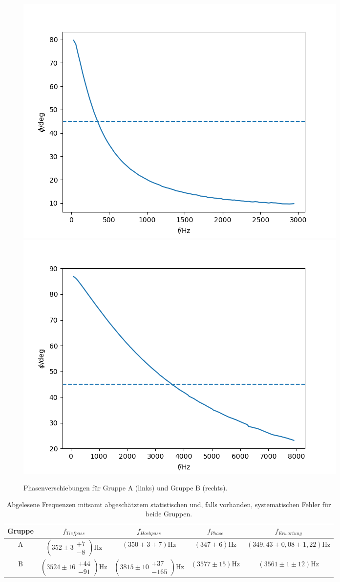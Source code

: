 \documentclass[12pt,a4paper]{article}
\begin{document}
\begin{figure}
\centering
\includegraphics[scale=0.5]{Bilder/PhaseHochTief_A.png}
\includegraphics[scale=0.5]{Bilder/PhaseHochTief_B.png}
\caption{Phasenverschiebungen für Gruppe A (links) und Gruppe B (rechts).}
\label{fig:HochTiefPhase}
\end{figure}


\begin{table}
\centering
\begin{tabular}{|c|c|c|c|c|}
\hline
Gruppe & $f_{Tiefpass}$ & $f_{Hochpass}$ & $f_{Phase}$ &  $f_{Erwartung}$ \\
\hline
A & $(352 \pm 3 \substack{+7\\-8})$Hz & $(350 \pm 3 \pm 7)$Hz & $(347 \pm 6)$Hz & $(349,43 \pm 0,08 \pm 1,22)$Hz \\
\hline
B & $(3524 \pm 16 \substack{+44 \\ -91})$Hz & $(3815 \pm 10 \substack{+37 \\ -165})$Hz & $(3577 \pm 15)$Hz & $(3561 \pm 1 \pm 12)$Hz \\
\hline
\end{tabular}
\caption{Abgelesene Frequenzen mitsamt abgeschätztem statistischen und, falls vorhanden, systematischen Fehler für beide Gruppen.}
\label{tab:HochTief}
\end{table}
\end{document}
